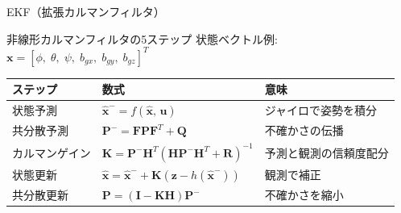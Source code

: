 \documentclass[aspectratio=169, 14pt]{beamer}
\begin{document}
\begin{frame}{EKF（拡張カルマンフィルタ）}
  \begin{block}{非線形カルマンフィルタの5ステップ}
    状態ベクトル例: $\mathbf{x} = [\phi,\;\theta,\;\psi,\;b_{gx},\;b_{gy},\;b_{gz}]^T$
  \end{block}

  \vspace{0.3em}

  {\small
  \begin{tabular}{lll}
    \hline
    \textbf{ステップ} & \textbf{数式} & \textbf{意味} \\
    \hline
    状態予測 & $\hat{\mathbf{x}}^- = f(\hat{\mathbf{x}},\,\mathbf{u})$ & ジャイロで姿勢を積分 \\
    共分散予測 & $\mathbf{P}^- = \mathbf{F}\mathbf{P}\mathbf{F}^T + \mathbf{Q}$ & 不確かさの伝播 \\
    カルマンゲイン & $\mathbf{K} = \mathbf{P}^-\mathbf{H}^T(\mathbf{H}\mathbf{P}^-\mathbf{H}^T + \mathbf{R})^{-1}$ & 予測と観測の信頼度配分 \\
    状態更新 & $\hat{\mathbf{x}} = \hat{\mathbf{x}}^- + \mathbf{K}(\mathbf{z} - h(\hat{\mathbf{x}}^-))$ & 観測で補正 \\
    共分散更新 & $\mathbf{P} = (\mathbf{I} - \mathbf{K}\mathbf{H})\mathbf{P}^-$ & 不確かさを縮小 \\
    \hline
  \end{tabular}
  }
\end{frame}
\end{document}
